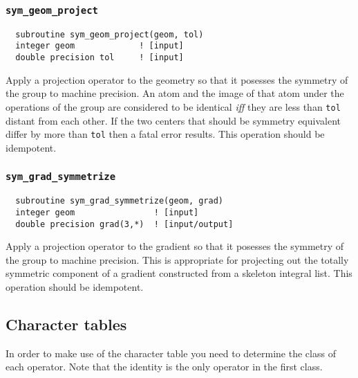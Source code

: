 \subsubsection{{\tt sym\_geom\_project}}
\begin{verbatim}
  subroutine sym_geom_project(geom, tol)
  integer geom             ! [input]
  double precision tol     ! [input]
\end{verbatim}
Apply a projection operator to the geometry so that it posesses the
symmetry of the group to machine precision.  An atom and the image of
that atom under the operations of the group are considered to be
identical {\em iff} they are less than \verb+tol+ distant from each
other.  If the two centers that should be symmetry equivalent differ
by more than \verb+tol+ then a fatal error results.  This operation
should be idempotent.

\subsubsection{{\tt sym\_grad\_symmetrize}}
\begin{verbatim}
  subroutine sym_grad_symmetrize(geom, grad)
  integer geom                ! [input]
  double precision grad(3,*)  ! [input/output]
\end{verbatim}
Apply a projection operator to the gradient so that it posesses the
symmetry of the group to machine precision.  This is appropriate for
projecting out the totally symmetric component of a gradient
constructed from a skeleton integral list.  This operation should be
idempotent. 

\subsection{Character tables}

In order to make use of the character table you need to determine the
class of each operator.  Note that the identity is the only operator
in the first class.

